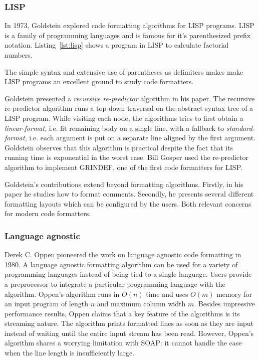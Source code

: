\subsubsection{LISP}\label{sec:lisp}
In 1973, Goldstein\autocite{goldstein_pretty-printing_1973} explored code formatting algorithms for LISP\autocite{mccarthy_recursive_1960} programs.
LISP is a family of programming languages and is famous for it's parenthesized prefix notation.
Listing~\ref{lst:lisp} shows a program in LISP to calculate factorial numbers.

The simple syntax and extensive use of parentheses as delimiters makes make LISP programs an excellent ground to study code formatters.

Goldstein presented a \emph{recursive re-predictor} algorithm in his paper.
The recursive re-predictor algorithm runs a top-down traversal on the abstract syntax tree of a LISP program.
While visiting each node, the algorithms tries to first obtain a \emph{linear-format},
i.e. fit remaining body on a single line,
with a fallback to \emph{standard-format},
i.e. each argument is put on a separate line aligned by the first argument.
Goldstein observes that this algorithm is practical despite the fact that its running time is exponential in the worst case.
Bill Gosper used the re-predictor algorithm to implement GRINDEF\autocite{_bill_????}, one of the first code formatters for LISP.

Goldstein's contributions extend beyond formatting algorithms.
Firstly, in his paper he studies how to format comments.
Secondly, he presents several different formatting layouts which can be configured by the users.
Both relevant concerns for modern code formatters.

\subsubsection{Language agnostic}\label{sec:agnostic}
Derek C. Oppen pioneered the work on language agnostic code formatting in 1980\autocite{oppen_prettyprinting_1980}.
A language agnostic formatting algorithm can be used for a variety of programming languages instead of being
tied to a single language.
Users provide a preprocessor to integrate a particular programming language with the algorithm.
Oppen's algorithm runs in $O(n)$ time and uses $O(m)$ memory for an input program of length $n$ and maximum column width $m$.
Besides impressive performance results, Oppen claims that a key feature of the algorithms is its streaming nature.
The algorithm prints formatted lines as soon as they are input instead of waiting until the entire input stream has been read.
However, Oppen's algorithm shares a worrying limitation with SOAP: it cannot handle the case when the line length is insufficiently large.

